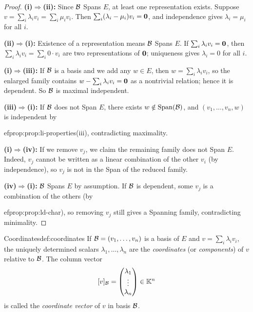 \begin{proof}
\textbf{(i)$\Rightarrow$(ii):} Since ${\mathcal{B}}$ Spans $E$, at least one
representation exists. Suppose
$v = \sum_i\lambda_i v_i = \sum_i\mu_i v_i$. Then
$\sum_i(\lambda_i-\mu_i)v_i = \mathbf{0}$, and independence gives
$\lambda_i = \mu_i$ for all $i$.

\textbf{(ii)$\Rightarrow$(i):} Existence of a representation means ${\mathcal{B}}$
Spans $E$. If $\sum_i\lambda_i v_i = \mathbf{0}$, then
$\sum_i\lambda_i v_i = \sum_i 0\cdot v_i$ are two representations of
$\mathbf{0}$; uniqueness gives $\lambda_i = 0$ for all $i$.

\textbf{(i)$\Rightarrow$(iii):} If ${\mathcal{B}}$ is a basis and we add any
$w\in E$, then $w = \sum_i\lambda_i v_i$, so the enlarged family
contains $w - \sum_i\lambda_i v_i = \mathbf{0}$ as a nontrivial relation;
hence it is dependent. So ${\mathcal{B}}$ is maximal independent.

\textbf{(iii)$\Rightarrow$(i):} If ${\mathcal{B}}$ does not Span $E$, there exists
$w\notin\operatorname{Span}({\mathcal{B}})$, and $(v_1,\ldots,v_n,w)$ is independent by

ef{prop:prop:li-properties}(iii), contradicting maximality.

\textbf{(i)$\Rightarrow$(iv):} If we remove $v_j$, we claim the
remaining family does not Span $E$. Indeed, $v_j$ cannot be written as a
linear combination of the other $v_i$ (by independence), so $v_j$ is not
in the Span of the reduced family.

\textbf{(iv)$\Rightarrow$(i):} ${\mathcal{B}}$ Spans $E$ by assumption. If ${\mathcal{B}}$
is dependent, some $v_j$ is a combination of the others (by

ef{prop:prop:ld-char}), so removing $v_j$ still gives a Spanning family,
contradicting minimality.
\end{proof}

\begin{definition}{Coordinates}{def:coordinates}
If ${\mathcal{B}} = (v_1,\ldots,v_n)$ is a basis of $E$ and $v = \sum_i\lambda_iv_i$,
the uniquely determined scalars $\lambda_1,\ldots,\lambda_n$ are the
\emph{coordinates} (or \emph{components}) of $v$ relative to ${\mathcal{B}}$. The
column vector
\[
  [v]_{\mathcal{B}} = \begin{pmatrix}\lambda_1\\\vdots\\\lambda_n\end{pmatrix}
  \in{\mathbb{K}}^n
\]
is called the \emph{coordinate vector} of $v$ in basis ${\mathcal{B}}$.
\end{definition}

